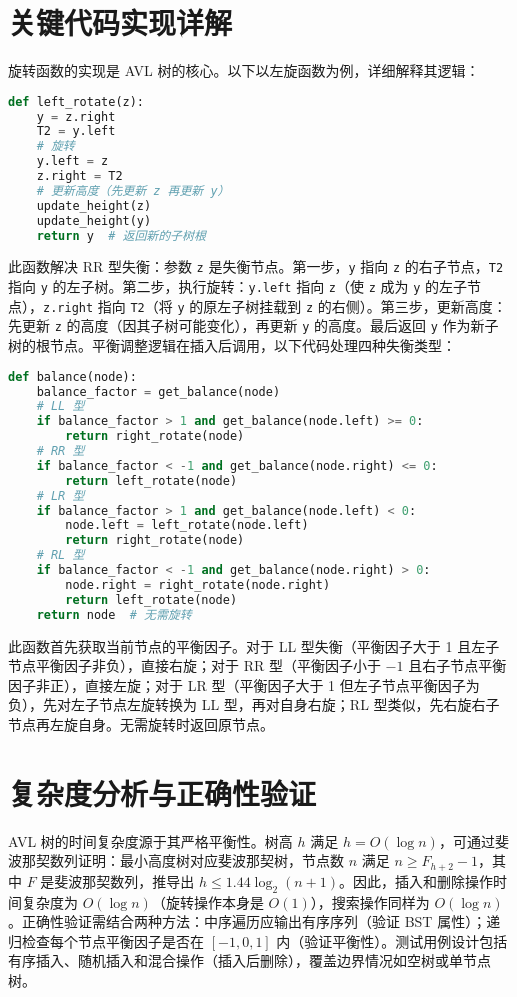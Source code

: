 \chapter{关键代码实现详解}
旋转函数的实现是 AVL 树的核心。以下以左旋函数为例，详细解释其逻辑：\par
\begin{lstlisting}[language=python]
def left_rotate(z):
    y = z.right
    T2 = y.left
    # 旋转
    y.left = z
    z.right = T2
    # 更新高度（先更新 z 再更新 y）
    update_height(z)
    update_height(y)
    return y  # 返回新的子树根
\end{lstlisting}
此函数解决 RR 型失衡：参数 \texttt{z} 是失衡节点。第一步，\texttt{y} 指向 \texttt{z} 的右子节点，\texttt{T2} 指向 \texttt{y} 的左子树。第二步，执行旋转：\texttt{y.left} 指向 \texttt{z}（使 \texttt{z} 成为 \texttt{y} 的左子节点），\texttt{z.right} 指向 \texttt{T2}（将 \texttt{y} 的原左子树挂载到 \texttt{z} 的右侧）。第三步，更新高度：先更新 \texttt{z} 的高度（因其子树可能变化），再更新 \texttt{y} 的高度。最后返回 \texttt{y} 作为新子树的根节点。平衡调整逻辑在插入后调用，以下代码处理四种失衡类型：\par
\begin{lstlisting}[language=python]
def balance(node):
    balance_factor = get_balance(node)
    # LL 型
    if balance_factor > 1 and get_balance(node.left) >= 0:
        return right_rotate(node)
    # RR 型
    if balance_factor < -1 and get_balance(node.right) <= 0:
        return left_rotate(node)
    # LR 型
    if balance_factor > 1 and get_balance(node.left) < 0:
        node.left = left_rotate(node.left)
        return right_rotate(node)
    # RL 型
    if balance_factor < -1 and get_balance(node.right) > 0:
        node.right = right_rotate(node.right)
        return left_rotate(node)
    return node  # 无需旋转
\end{lstlisting}
此函数首先获取当前节点的平衡因子。对于 LL 型失衡（平衡因子大于 1 且左子节点平衡因子非负），直接右旋；对于 RR 型（平衡因子小于 $-1$ 且右子节点平衡因子非正），直接左旋；对于 LR 型（平衡因子大于 1 但左子节点平衡因子为负），先对左子节点左旋转换为 LL 型，再对自身右旋；RL 型类似，先右旋右子节点再左旋自身。无需旋转时返回原节点。\par
\chapter{复杂度分析与正确性验证}
AVL 树的时间复杂度源于其严格平衡性。树高 $h$ 满足 $h = O(\log n)$，可通过斐波那契数列证明：最小高度树对应斐波那契树，节点数 $n$ 满足 $n \geq F_{h+2} - 1$，其中 $F$ 是斐波那契数列，推导出 $h \leq 1.44 \log_2(n+1)$。因此，插入和删除操作时间复杂度为 $O(\log n)$（旋转操作本身是 $O(1)$），搜索操作同样为 $O(\log n)$。正确性验证需结合两种方法：中序遍历应输出有序序列（验证 BST 属性）；递归检查每个节点平衡因子是否在 $[-1, 0, 1]$ 内（验证平衡性）。测试用例设计包括有序插入、随机插入和混合操作（插入后删除），覆盖边界情况如空树或单节点树。\par

